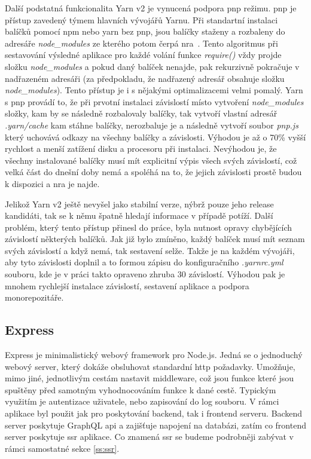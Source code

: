 Další podstatná funkcionalita Yarn v2 je vynucená podpora \acrfull{pnp} režimu. \acrshort{pnp} je přístup zavedený týmem hlavních vývojářů Yarnu. Při standartní instalaci balíčků pomocí npm nebo yarn bez pnp, jsou balíčky staženy a rozbaleny do adresáře \emph{node\_modules} ze kterého potom čerpá \acrfull{nra}~\cite{joyentinc_1_noderesolutionalgorithm}. Tento algoritmus při sestavování výsledné aplikace pro každé volání funkce \emph{require()} vždy projde složku \emph{node\_modules} a pokud daný balíček nenajde, pak rekurzivně pokračuje v nadřazeném adresáři (za předpokladu, že nadřazený adresář obsahuje složku \emph{node\_modules}). Tento přístup je i s nějakými optimalizacemi velmi pomalý. Yarn s \acrshort{pnp} provádí to, že při prvotní instalaci závislostí místo vytvoření \emph{node\_modules} složky, kam by se následně rozbalovaly balíčky, tak vytvoří vlastní adresář \emph{.yarn/cache} kam stáhne balíčky, nerozbaluje je a následně vytvoří soubor \emph{pnp.js} který uchovává odkazy na všechny balíčky a závislosti. Výhodou je až o 70\% vyšší rychlost a menší zatížení disku a procesoru při instalaci. Nevýhodou je, že všechny instalované balíčky musí mít explicitní výpis všech svých závislostí, což velká část do dnešní doby nemá a spoléhá na to, že jejich závislosti prostě budou k dispozici a \acrshort{nra} je najde.

Jelikož Yarn v2 ještě nevyšel jako stabilní verze, nýbrž pouze jeho release kandidáti, tak se k němu špatně hledají informace v případě potíží. Další problém, který tento přístup přinesl do práce, byla nutnost opravy chybějících závislostí některých balíčků. Jak již bylo zmíněno, každý balíček musí mít seznam svých závislostí a když nemá, tak sestavení selže. Takže je na každém vývojáři, aby tyto závislosti doplnil a to formou zápisu do konfiguračního \emph{.yarnrc.yml} souboru, kde je v práci takto opraveno zhruba 30 závislostí. Výhodou pak je mnohem rychlejší instalace závislostí, sestavení aplikace a podpora monorepozitáře.

\subsection{Express}
\label{ss:express}
Express je minimalistický webový framework pro Node.js. Jedná se o jednoduchý webový server, který dokáže obsluhovat standardní http požadavky. Umožňuje, mimo jiné, jednotlivým cestám nastavit middleware, což jsou funkce které jsou spuštěny před samotným vyhodnocováním funkce k dané cestě. Typickým využitím je autentizace uživatele, nebo zapisování do log souboru. V rámci aplikace byl použit jak pro poskytování backend, tak i frontend serveru. Backend server poskytuje GraphQL \acrshort{api} a zajišťuje napojení na databázi, zatím co frontend server poskytuje \acrfull{ssr} aplikace. Co znamená \acrfull{ssr} se budeme podrobněji zabývat v rámci samostatné sekce \ref{ss:ssr}.

